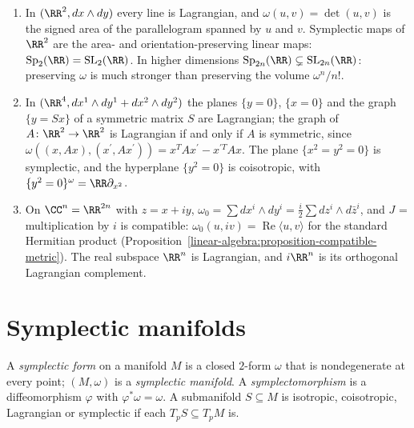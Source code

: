 \begin{example}\label{symplectic-geometry:example-linear}
\begin{enumerate}
\item In $(\RR^2, dx \wedge dy)$ every line is Lagrangian, and $\omega(u, v) = \det(u, v)$ is the signed area of the parallelogram spanned by $u$ and $v$. Symplectic maps of $\RR^2$ are the area- and
orientation-preserving linear maps: $\mathrm{Sp}_2(\RR) = \mathrm{SL}_2(\RR)$. In higher dimensions $\mathrm{Sp}_{2n}(\RR) \subsetneq \mathrm{SL}_{2n}(\RR)$: preserving $\omega$ is much stronger than
preserving the volume $\omega^n/n!$.
\item In $(\RR^4, dx^1 \wedge dy^1 + dx^2 \wedge dy^2)$ the planes $\{y = 0\}$, $\{x = 0\}$ and the graph $\{y = Sx\}$ of a symmetric matrix $S$ are Lagrangian; the graph of $A \colon \RR^2 \to \RR^2$ is
Lagrangian if and only if $A$ is symmetric, since $\omega((x, Ax), (x^{\prime}, Ax^{\prime})) = x^TAx^{\prime} - x^{\prime T}Ax$. The plane $\{x^2 = y^2 = 0\}$ is symplectic, and the hyperplane
$\{y^2 = 0\}$ is coisotropic, with $\{y^2 = 0\}^\omega = \RR\partial_{x^2}$.
\item On $\CC^n = \RR^{2n}$ with $z = x + iy$, $\omega_0 = \sum dx^i \wedge dy^i = \frac i2\sum dz^i \wedge d\bar z^i$, and $J$ = multiplication by $i$ is compatible: $\omega_0(u, iv) = \operatorname{Re}\langle u, v\rangle$
for the standard Hermitian product (Proposition~\ref{linear-algebra:proposition-compatible-metric}). The real subspace $\RR^n$ is Lagrangian, and $i\RR^n$ is its orthogonal Lagrangian complement.
\end{enumerate}
\end{example}

\section{Symplectic manifolds}\label{symplectic-geometry:section-manifolds}

\begin{definition}\label{symplectic-geometry:definition-symplectic-manifold}
A \emph{symplectic form} on a manifold $M$ is a closed $2$-form $\omega$ that is nondegenerate at every point; $(M, \omega)$ is a \emph{symplectic manifold}. A \emph{symplectomorphism} is a
diffeomorphism $\varphi$ with $\varphi^*\omega = \omega$. A submanifold $S \subseteq M$ is isotropic, coisotropic, Lagrangian or symplectic if each $T_pS \subseteq T_pM$ is.
\end{definition}

